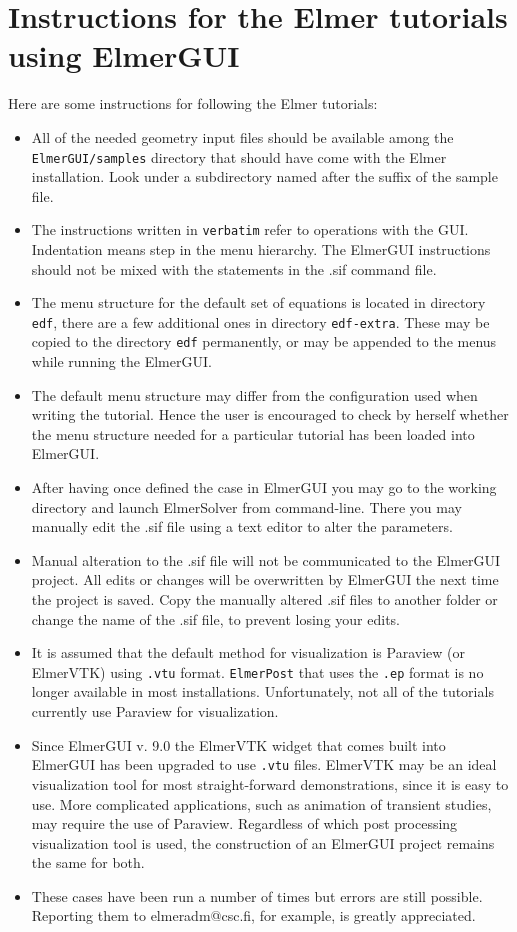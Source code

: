 \chapter*{Instructions for the Elmer tutorials using ElmerGUI}

Here are some instructions for following the Elmer tutorials:
\begin{itemize}
\item All of the needed geometry input files should be available among 
the \texttt{ElmerGUI/samples} directory that should have come with the 
Elmer installation. Look under a subdirectory named after the suffix of the sample file.  
%
\item The instructions written in \texttt{verbatim} refer to operations 
  with the GUI. Indentation means step in the menu hierarchy. 
  The ElmerGUI instructions should not be mixed with the statements in 
the .sif command file. 
%
\item The menu structure for the default set of equations is located 
  in directory \texttt{edf}, there are a few additional ones in 
  directory \texttt{edf-extra}. These may be copied to the directory \texttt{edf}
  permanently, or may be appended to the menus while running the ElmerGUI. 
%
\item The default menu structure may differ from the configuration used
  when writing the tutorial. Hence the user is encouraged to check by herself 
  whether the menu structure needed for a particular tutorial has been loaded 
into ElmerGUI. 
%
\item After having once defined the case in ElmerGUI you may go to the 
working directory and launch ElmerSolver from command-line. There you 
may manually edit the .sif file using a text editor to alter the parameters.
%
\item Manual alteration to the .sif file will not be communicated to the
  ElmerGUI project. All edits or changes will be overwritten by ElmerGUI the 
next time the project is saved.  Copy the manually altered .sif files to another
folder or change the name of the .sif file, to prevent losing your edits.
%
\item It is assumed that the default method for visualization is Paraview (or ElmerVTK) 
using \texttt{.vtu} format.  \texttt{ElmerPost} that uses the \texttt{.ep} 
format is no longer available in most installations.  Unfortunately, not all of the tutorials 
currently use Paraview for visualization.
  
\item Since ElmerGUI v. 9.0 the ElmerVTK widget that comes built into ElmerGUI has 
been upgraded to use \texttt{.vtu} files. ElmerVTK may be an ideal visualization 
tool for most straight-forward demonstrations, since it is easy to use.  More 
complicated applications, such as animation of transient studies, may require the 
use of Paraview.  Regardless of which post processing visualization tool is used, the
construction of an ElmerGUI project remains the same for both.
%
\item These cases have been run a number of times but errors are still possible.
  Reporting them to elmeradm@csc.fi, for example, is greatly appreciated. 
  
\end{itemize}







